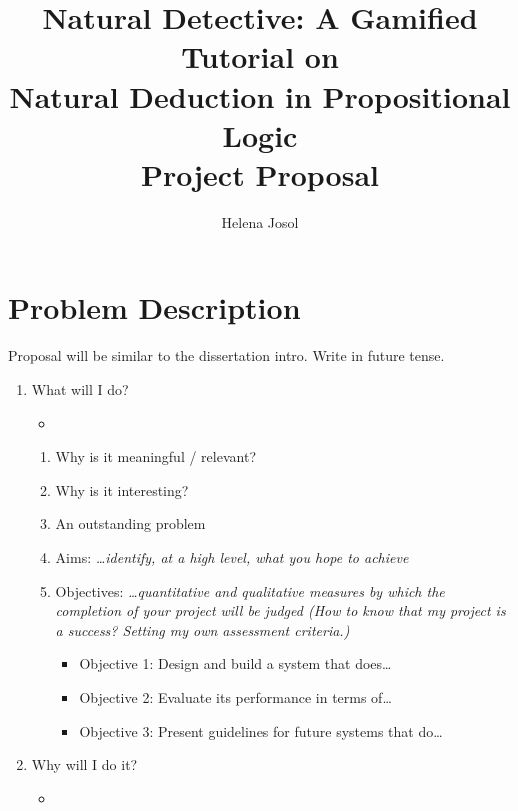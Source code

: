 \documentclass[a4paper]{article}
\author{Helena Josol \autocite{adjl-blog}}
\title{Natural Detective: A Gamified Tutorial on \\ Natural Deduction in Propositional Logic \\
  \medskip \Large{Project Proposal}}
\date{}
\begin{document}
\maketitle


\section{Problem Description} %
Proposal will be similar to the dissertation intro. Write in future tense.
\begin{enumerate}
  \item What will I do?
    \begin{itemize}
      \item {}
    \end{itemize}
    \begin{enumerate}
      \item Why is it meaningful / relevant?
      \item Why is it interesting?
      \item An outstanding problem
      \item Aims: \textit{\dots identify, at a high level, what you hope to achieve}
      \item Objectives: \textit{\dots quantitative and qualitative measures by which the completion of your project will be judged (How to know that my project is a success? Setting my own assessment criteria.)}
        \begin{itemize}
          \item Objective 1: Design and build a system that does\dots
          \item Objective 2: Evaluate its performance in terms of\dots
          \item Objective 3: Present guidelines for future systems that do\dots
        \end{itemize}
    \end{enumerate}
  \item Why will I do it?
    \begin{itemize}
      \item {}
      \begin{itemize}

\end{itemize}
\end{itemize}
\end{enumerate}
\end{document}
